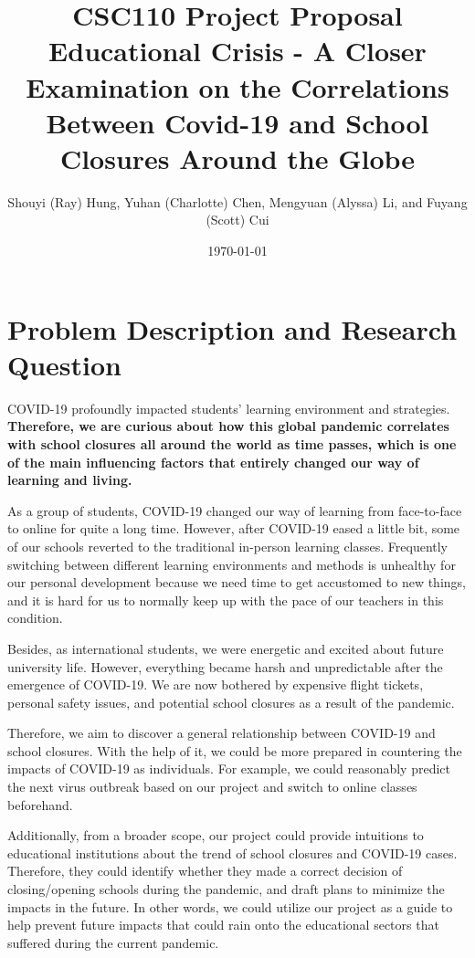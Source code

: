 \documentclass[fontsize=11pt]{article}
\title{CSC110 Project Proposal\\ Educational Crisis - A Closer Examination on the Correlations Between Covid-19 and School Closures Around the Globe}
\author{Shouyi (Ray) Hung, Yuhan (Charlotte) Chen, Mengyuan (Alyssa) Li, and Fuyang (Scott) Cui}
\date{\today}
\begin{document}
\maketitle

\section*{Problem Description and Research Question}

COVID-19 profoundly impacted students’ learning environment and strategies. \textbf{Therefore, we are curious about how this global pandemic correlates with school closures all around the world as time passes, which is one of the main influencing factors that entirely changed our way of learning and living.}

As a group of students, COVID-19 changed our way of learning from face-to-face to online for quite a long time. However, after COVID-19 eased a little bit, some of our schools reverted to the traditional in-person learning classes. Frequently switching between different learning environments and methods is unhealthy for our personal development because we need time to get accustomed to new things, and it is hard for us to normally keep up with the pace of our teachers in this condition.

Besides, as international students, we were energetic and excited about future university life. However, everything became harsh and unpredictable after the emergence of COVID-19. We are now bothered by expensive flight tickets, personal safety issues, and potential school closures as a result of the pandemic.

Therefore, we aim to discover a general relationship between COVID-19 and school closures. With the help of it, we could be more prepared in countering the impacts of COVID-19 as individuals. For example, we could reasonably predict the next virus outbreak based on our project and switch to online classes beforehand.

Additionally, from a broader scope, our project could provide intuitions to educational institutions about the trend of school closures and COVID-19 cases. Therefore, they could identify whether they made a correct decision of closing/opening schools during the pandemic, and draft plans to minimize the impacts in the future. In other words, we could utilize our project as a guide to help prevent future impacts that could rain onto the educational sectors that suffered during the current pandemic.
\end{document}
